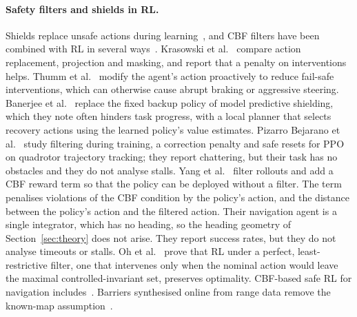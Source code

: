 \documentclass[11pt]{article}
\theoremstyle{definition}
\theoremstyle{remark}
\begin{document}
\paragraph{Safety filters and shields in RL.} Shields replace unsafe actions during learning~\cite{alshiekh2018shielding,carr2023shielding}, and CBF filters have been combined with RL in several ways~\cite{cheng2019endtoend,emam2025robust,xiao2023barriernet,pham2018optlayer}. Krasowski et al.~\cite{krasowski2023provably} compare action replacement, projection and masking, and report that a penalty on interventions helps. Thumm et al.~\cite{thumm2023reducing} modify the agent's action proactively to reduce fail-safe interventions, which can otherwise cause abrupt braking or aggressive steering. Banerjee et al.~\cite{banerjee2024dmps} replace the fixed backup policy of model predictive shielding, which they note often hinders task progress, with a local planner that selects recovery actions using the learned policy's value estimates. Pizarro Bejarano et al.~\cite{pizarro2025filtering} study filtering during training, a correction penalty and safe resets for PPO on quadrotor trajectory tracking; they report chattering, but their task has no obstacles and they do not analyse stalls. Yang et al.~\cite{yang2026cbfrl} filter rollouts and add a CBF reward term so that the policy can be deployed without a filter. The term penalises violations of the CBF condition by the policy's action, and the distance between the policy's action and the filtered action. Their navigation agent is a single integrator, which has no heading, so the heading geometry of Section~\ref{sec:theory} does not arise. They report success rates, but they do not analyse timeouts or stalls. Oh et al.~\cite{oh2026optimal} prove that RL under a perfect, least-restrictive filter, one that intervenes only when the nominal action would leave the maximal controlled-invariant set, preserves optimality. CBF-based safe RL for navigation includes~\cite{song2022lidar,marzari2025probabilistic,xie2025certificated,guo2025radar}. Barriers synthesised online from range data remove the known-map assumption~\cite{keyumarsi2024lidar,long2021barrier}.
\end{document}
